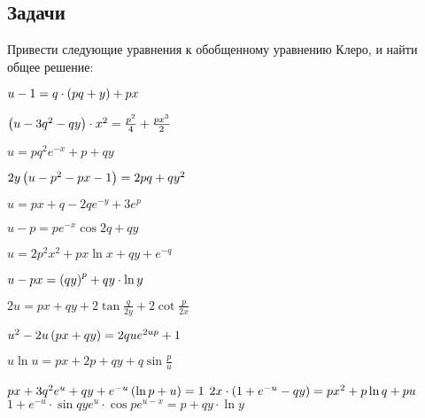 \subsection{Задачи}

	Привести следующие уравнения к обобщенному уравнению Клеро, и найти общее решение:

	\begin{multicols}{2}
		\begin{enumtasks}

			\label{charpit_clauret:simple_changes}
			\item \( u - 1 = q \cdot \left( pq + y \right) + px \) 								%
			\item \( \left( u - 3q^2 - qy \right) \cdot x^2 = \frac{p^2}{4} + \frac{px^3}{2} \) 	%
			\item \( u = pq^2 e^{-x} + p + qy \) 											%
			\item \( 2y \left( u - p^2 - px - 1 \right) = 2pq + q y^2 \) 							%
			\item \( u = px + q - 2qe^{-y} + 3 e^{p} \) 									%
			\item \( u - p = pe^{-x} \cos{2q} + q y \) 										%
			\item \( u = 2 p^2 x^2 + px \ln{x} + qy + e^{-q} \) 							%
			\item \( u - px = \left( qy \right)^p + qy \cdot \ln{y} \)								%
			
			\label{charpit_clauret:simple_changes_part2}
			\item \( 2u = px + qy + 2 \tan{\frac{q}{2y}} + 2 \cot{\frac{p}{2x}} \) 			%
			\item \( u^{2} - 2u \left( px + qy \right) = 2 qu e^{2 up} + 1 \) 						%
			\item \( u \ln{u} = p x + 2 p + q y + q \sin{\frac{p}{u}}  \) 					%
			\item \( p x + 3 q^{2} e^{u} + q y + e^{-u} \left( \ln{p} + u \right) = 1 \) 			%
			\itemstar \( 2x \cdot \left( 1 + e^{-u} - qy \right) = p x^2 + p \ln{q} + pu \) 			%
			\itemstar \( 1 + e^{-u}\cdot \sin qy e^u \cdot\cos p e^{u-x} = p+qy \cdot \ln{y} \)	%

		\end{enumtasks}
	\end{multicols}

